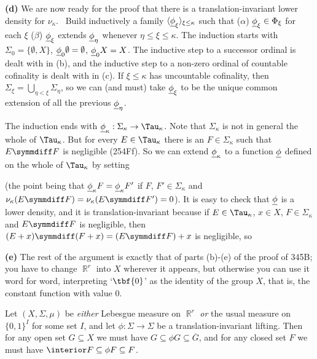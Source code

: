 {\medskip

{\bf (d)} We are now ready for the proof that there is a
translation-invariant lower density for $\nu_{\kappa}$.   \Prf\ Build inductively a
family $\langle{\underline{\phi}}_{\xi}\rangle_{\xi\le\kappa}$ such that ($\alpha$)
${\underline{\phi}}_{\xi}\in\Phi_{\xi}$ for each $\xi$ ($\beta$) ${\underline{\phi}}_{\xi}$
extends
${\underline{\phi}}_{\eta}$ whenever $\eta\le\xi\le\kappa$.   The induction starts
with $\Sigma_0=\{\emptyset,X\}$, ${\underline{\phi}}_0\emptyset=\emptyset$,
${\underline{\phi}}_0X=X$.   The inductive step to a successor ordinal is dealt
with in (b), and the inductive step to a non-zero ordinal of countable
cofinality is dealt with in (c).   If $\xi\le\kappa$ has uncountable
cofinality, then $\Sigma_{\xi}=\bigcup_{\eta<\xi}\Sigma_{\eta}$, so we
can (and must) take ${\underline{\phi}}_{\xi}$ to be the unique common extension of
all the previous ${\underline{\phi}}_{\eta}$.

The induction ends with
$\undphi_{\kappa}:\Sigma_{\kappa}\to\Tau_{\kappa}$.   Note that
$\Sigma_{\kappa}$ is not in general the whole of $\Tau_{\kappa}$.   But for
every $E\in\Tau_{\kappa}$ there is an $F\in\Sigma_{\kappa}$ such that
$E\symmdiff F$ is negligible (254Ff).   So we can extend
${\underline{\phi}}_{\kappa}$ to a function ${\underline{\phi}}$ defined on the whole of
$\Tau_{\kappa}$ by setting


\noindent (the point being that ${\underline{\phi}}_{\kappa}F={\underline{\phi}}_{\kappa}F'$
if $F$, $F'\in\Sigma_{\kappa}$ and $\nu_{\kappa}(E\symmdiff
F)=\nu_{\kappa}(E\symmdiff F')=0$).   It is easy to check that ${\underline{\phi}}$ is a
lower density, and it is translation-invariant because if $E\in\Tau_{\kappa}$,
$x\in X$, $F\in\Sigma_{\kappa}$ and $E\symmdiff F$ is negligible, then
$(E+x)\symmdiff(F+x)=(E\symmdiff F)+x$ is negligible, so


\medskip

{\bf (e)} The rest of the argument is exactly that of parts (b)-(e) of
the proof of 345B;  you have to change $\BbbR^r$ into $X$ wherever it
appears, but otherwise you can use it word for word, interpreting
`$\tbf{0}$' as the identity of the group $X$, that is, the constant
function with value $0$.
}%

 Let $(X,\Sigma,\mu)$ be {\it either}
Lebesgue measure on $\BbbR^r$ {\it or} the usual measure on $\{0,1\}^I$
for some set $I$, and let $\phi:\Sigma\to\Sigma$ be a
translation-invariant lifting.   Then for any open set $G\subseteq X$ we
must have $G\subseteq\phi G\subseteq\overline{G}$, and for any closed
set $F$ we must have $\interior F\subseteq\phi F\subseteq F$.

